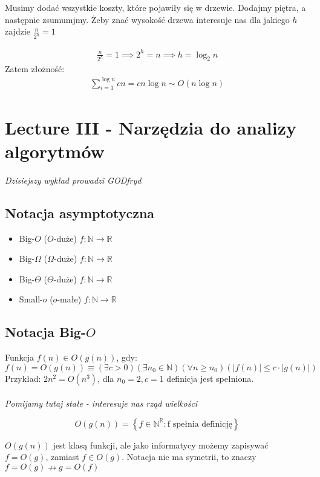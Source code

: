 \documentclass{article}
\newenvironment{definition}[1]{%
    \trivlist
    \item[\hskip\labelsep\textbf{Definition. #1.}]
    \ignorespaces
}{%
    \endtrivlist
}
\begin{document}
\noindent
Musimy dodać wszystkie koszty, które pojawiły się w drzewie. Dodajmy piętra, a następnie zsumumjmy. 
Żeby znać wysokość drzewa interesuje nas dla jakiego $h$ zajdzie $\frac{n}{2^h} = 1$

\begin{align}
    \frac{n}{2^h} = 1 \implies 2^h = n \implies h = \log_2 n
\end{align}
Zatem złożność:
\begin{align}
    \sum_{i=1}^{\log n} cn = cn\log n \sim O(n\log n)
\end{align}

\section{Lecture III - Narzędzia do analizy algorytmów}

\textit{Dzisiejszy wykład prowadzi GODfryd}

\subsection{Notacja asymptotyczna}

\begin{itemize}
    \item Big-$O$ ($O$-duże) $f: \mathbb{N} \rightarrow \mathbb{R}$
    \item Big-$\Omega$ ($\Omega$-duże) $f: \mathbb{N} \rightarrow \mathbb{R}$
    \item Big-$\Theta$ ($\Theta$-duże) $f: \mathbb{N} \rightarrow \mathbb{R}$
    \item Small-$o$ ($o$-małe) $f: \mathbb{N} \rightarrow \mathbb{R}$
\end{itemize}

\subsection{Notacja Big-$O$}

\begin{definition}{Notacja Big-$O$}
    Funkcja $f(n)\in O(g(n))$, gdy:
    \[
        f(n) = O(g(n)) \equiv 
        \left(\exists c>0\right)
        \left(\exists n_0\in\mathbb{N}\right)
        \left(\forall n\geq n_0\right)
        \left(|f(n)| \leq c \cdot |g(n)|\right)
    \]
    \noindent
    Przykład: $2n^2 = O(n^3)$, dla $n_0 = 2, c = 1$ definicja jest spełniona.\\
    \\
    \textit{Pomijamy tutaj stałe - interesuje nas rząd wielkości}

    \[
        O(g(n)) = \left\{f\in\mathbb{N}^\mathbb{R} : \text{f spełnia definicję}\right\}
    \]

    \noindent
    $O(g(n))$ jest klasą funkcji, ale jako informatycy możemy zapisywać $f=O(g)$, zamiast $f\in O(g)$.
    Notacja nie ma symetrii, to znaczy $f=O(g) \nrightarrow  g=O(f)$ 
\end{definition}
\end{document}
